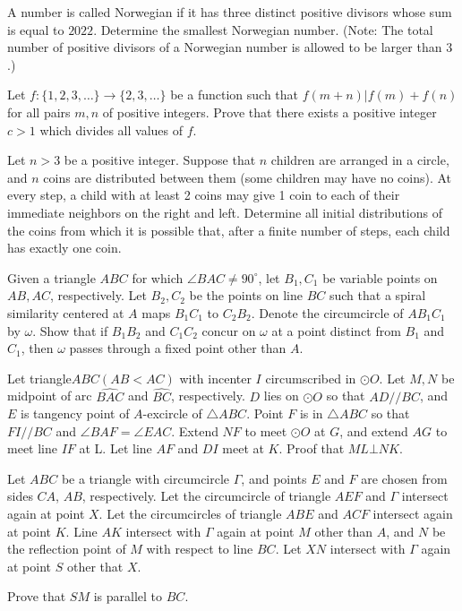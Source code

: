 \documentclass[11pt]{scrartcl}
\begin{document}
\begin{problem}[660403976209529]
A number is called Norwegian if it has three distinct positive divisors whose sum is equal to $2022$. Determine the smallest Norwegian number.
(Note: The total number of positive divisors of a Norwegian number is allowed to be larger than $3$.)
\end{problem}
\begin{problem}[208441124738479]
Let $f : \{ 1, 2, 3, \dots \} \to \{ 2, 3, \dots \}$ be a function such that $f(m + n) | f(m) + f(n) $ for all pairs $m,n$ of positive integers. Prove that there exists a positive integer $c > 1$ which divides all values of $f$.
\end{problem}
\begin{problem}[931951248564234]
Let $n > 3$ be a positive integer. Suppose that $n$ children are arranged in a circle, and $n$ coins are distributed between them (some children may have no coins). At every step, a child with at least 2 coins may give 1 coin to each of their immediate neighbors on the right and left. Determine all initial distributions of the coins from which it is possible that, after a finite number of steps, each child has exactly one coin.
\end{problem}
\begin{problem}[852531542088551]
	Given a triangle $ABC$ for which $\angle BAC \neq 90^{\circ}$, let $B_1, C_1$ be variable points on $AB,AC$, respectively. Let $B_2,C_2$ be the points on line $BC$ such that a spiral similarity centered at $A$ maps $B_1C_1$ to $C_2B_2$. Denote the circumcircle of $AB_1C_1$ by $\omega$. Show that if $B_1B_2$ and $C_1C_2$ concur on $\omega$ at a point distinct from $B_1$ and $C_1$, then $\omega$ passes through a fixed point other than $A$.
\end{problem}
\begin{problem}[239934686230450]
Let triangle$ABC(AB<AC)$ with incenter $I$ circumscribed in $\odot O$. Let $M,N$ be midpoint of arc $\widehat{BAC}$ and $\widehat{BC}$, respectively. $D$ lies on $\odot O$ so that $AD//BC$, and $E$ is tangency point of $A$-excircle of $\bigtriangleup ABC$. Point $F$ is in $\bigtriangleup ABC$ so that $FI//BC$ and $\angle BAF=\angle EAC$. Extend $NF$ to meet $\odot O$ at $G$, and extend $AG$ to meet line $IF$ at L. Let line $AF$ and $DI$ meet at $K$. Proof that $ML\bot NK$.
\end{problem}
\begin{problem}[5897111412933990257]
Let $ABC$ be a triangle with circumcircle $\Gamma$, and points $E$ and $F$ are chosen from sides $CA$, $AB$, respectively. Let the circumcircle of triangle $AEF$ and $\Gamma$ intersect again at point $X$. Let the circumcircles of triangle $ABE$ and $ACF$ intersect again at point $K$. Line $AK$ intersect with $\Gamma$ again at point $M$ other than $A$, and $N$ be the reflection point of $M$ with respect to line $BC$. Let $XN$ intersect with $\Gamma$ again at point $S$ other that $X$.

Prove that $SM$ is parallel to $BC$.
\end{problem}
\end{document}

